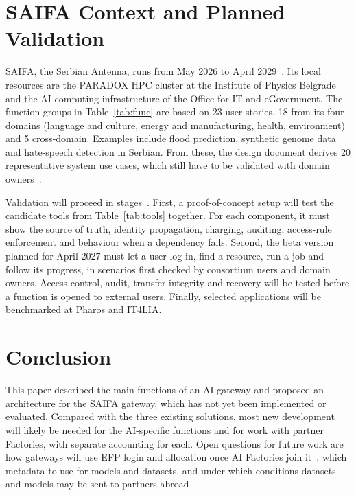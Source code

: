 \documentclass[conference,a4paper]{IEEEtran}
\newif\ifizmene
\DeclareRobustCommand{\chg}[1]{#1}
\DeclareRobustCommand{\roz}[1]{#1}
\DeclareRobustCommand{\nov}[1]{#1}
\DeclareRobustCommand{\tri}[1]{#1}
\DeclareRobustCommand{\fin}[1]{\ifizmene{\color{finalna}#1}\else#1\fi}
\begin{document}
\section{\nov{SAIFA Context and Planned Validation}}
\label{sec:saifa}

SAIFA, \chg{the Serbian Antenna, runs} from May 2026 to April 2029~\cite{cordis_saifa}. Its local resources are the PARADOX HPC cluster at the Institute of Physics Belgrade and the AI \roz{computing infrastructure of the Office for IT and eGovernment}. \roz{The function groups in Table~\ref{tab:func}} \nov{are based on} \roz{23 user stories, 18 from its four domains (language and culture, energy and manufacturing, health, environment) and 5 cross-domain. Examples include flood prediction, synthetic genome data and hate-speech detection in Serbian.} \nov{From these, the design \tri{document} derives 20 representative system use cases, which still have to be validated with domain owners}~\cite{saifa_d31}.

\fin{Validation will proceed in stages}~\cite{saifa_d31}. \nov{First, a} proof-of-concept setup \nov{will} test the candidate tools \nov{from Table~\ref{tab:tools}} together\fin{. For each component, it must show the source of truth, identity propagation, charging, auditing, access-rule enforcement and behaviour when a dependency fails}. \nov{Second, the beta version planned for April 2027 must let a user log in, find a resource, run a job and follow its progress}\fin{, in scenarios first checked by consortium users and domain owners. Access control, audit, transfer integrity and recovery will be tested before a function is opened to external users. Finally, selected applications will be benchmarked at Pharos and IT4LIA.}

\section{Conclusion}

\nov{This paper described the main functions of an AI gateway and proposed an architecture for the SAIFA gateway, which has not yet been implemented or evaluated. Compared with the three existing solutions, most new development will likely be needed for the AI-specific functions and for work with partner Factories, with separate accounting for each.} \chg{Open questions} \roz{for future work} \chg{are how gateways will use EFP login and allocation} \tri{once AI Factories join it~\cite{eurohpc_efp},} \chg{which metadata to use for models and datasets, and} \tri{under which conditions datasets and models may be sent to partners abroad~\cite{saifa_d31}.}



\end{document}
